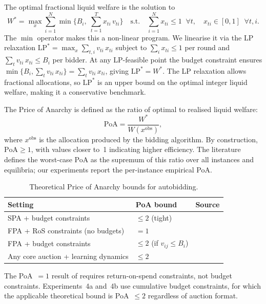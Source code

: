 The optimal fractional liquid welfare is the solution to
\begin{equation}
  W^* = \max_{x} \sum_{i=1}^{N} \min\!\Big\{B_i,\; \sum_{t=1}^{T} x_{ti}\, v_{ti}\Big\}
  \quad \text{s.t.} \quad
  \sum_{i=1}^{N} x_{ti} \leq 1 \;\; \forall t, \quad
  x_{ti} \in [0,1] \;\; \forall t,i.
  \label{eq:welfare_opt}
\end{equation}
The $\min$ operator makes this a non-linear program. We linearise it via the LP relaxation $\mathrm{LP}^* = \max_{x} \sum_{t,i} v_{ti}\, x_{ti}$ subject to $\sum_i x_{ti} \le 1$ per round and $\sum_t v_{ti}\, x_{ti} \le B_i$ per bidder. At any LP-feasible point the budget constraint ensures $\min\{B_i, \sum_t v_{ti}\, x_{ti}\} = \sum_t v_{ti}\, x_{ti}$, giving $\mathrm{LP}^* = W^*$. The LP relaxation allows fractional allocations, so $\mathrm{LP}^*$ is an upper bound on the optimal integer liquid welfare, making it a conservative benchmark.

The Price of Anarchy is defined as the ratio of optimal to realised liquid welfare:
\begin{equation}
  \text{PoA} = \frac{W^*}{W(x^{\text{obs}})},
  \label{eq:poa_def}
\end{equation}
where $x^{\text{obs}}$ is the allocation produced by the bidding algorithm. By construction, $\text{PoA} \geq 1$, with values closer to~1 indicating higher efficiency. The literature defines the worst-case PoA as the supremum of this ratio over all instances and equilibria; our experiments report the per-instance empirical PoA.

\begin{table}[H]
\centering
\small
\caption{Theoretical Price of Anarchy bounds for autobidding.}
\label{tab:poa_bounds}
\begin{tabular}{lll}
\toprule
\textbf{Setting} & \textbf{PoA bound} & \textbf{Source} \\
\midrule
SPA + budget constraints & $\leq 2$ (tight) & \citet{Aggarwal2019} \\
FPA + RoS constraints (no budgets) & $= 1$ & \citet{Deng2021TowardsEfficient} \\
FPA + budget constraints & $\leq 2$ (if $v_{ij} \leq B_i$) & \citet{Aggarwal2024Survey} \\
Any core auction + learning dynamics & $\leq 2$ & \citet{Gaitonde2023} \\
\bottomrule
\end{tabular}
\end{table}

The PoA~$= 1$ result of \citet{Deng2021TowardsEfficient} requires return-on-spend constraints, not budget constraints. Experiments~4a and~4b use cumulative budget constraints, for which the applicable theoretical bound is PoA~$\leq 2$ regardless of auction format.
